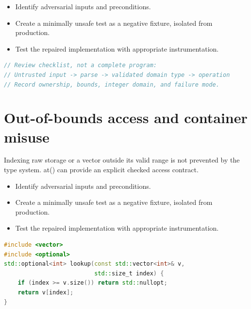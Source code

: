 \documentclass[11pt]{article}
\begin{document}
\begin{itemize}[leftmargin=*,itemsep=1pt,topsep=3pt]
\item Identify adversarial inputs and preconditions.
\item Create a minimally unsafe test as a negative fixture, isolated from production.
\item Test the repaired implementation with appropriate instrumentation.
\end{itemize}
\begin{lstlisting}[language=C++]
// Review checklist, not a complete program:
// Untrusted input -> parse -> validated domain type -> operation
// Record ownership, bounds, integer domain, and failure mode.
\end{lstlisting}
\section{Out-of-bounds access and container misuse}
Indexing raw storage or a vector outside its valid range is not prevented by the type system. at() can provide an explicit checked access contract.

\begin{itemize}[leftmargin=*,itemsep=1pt,topsep=3pt]
\item Identify adversarial inputs and preconditions.
\item Create a minimally unsafe test as a negative fixture, isolated from production.
\item Test the repaired implementation with appropriate instrumentation.
\end{itemize}
\begin{lstlisting}[language=C++]
#include <vector>
#include <optional>
std::optional<int> lookup(const std::vector<int>& v,
                          std::size_t index) {
    if (index >= v.size()) return std::nullopt;
    return v[index];
}
\end{lstlisting}
\end{document}
